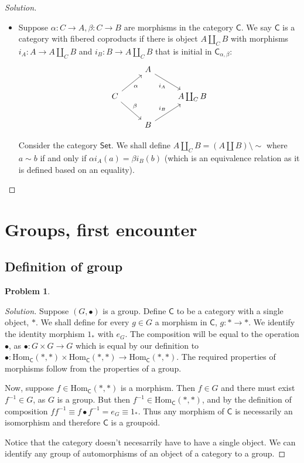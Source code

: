\documentclass{article}
\theoremstyle{definition}
\newtheorem{problem-internal}{Problem}[subsection]
\newenvironment{problem}{
	\medskip
	\begin{problem-internal}
	}{
\end{problem-internal}
}
\newenvironment{solution}{
	\begin{proof}[Solution]
		\vspace{-8px}
		\setlength{\parskip}{4px}
		\setlength{\parindent}{0px}
	}{
\end{proof}
}
\newcommand{\Hom}{\mathrm{Hom}}
\newcommand{\C}{\mathsf{C}}
\newcommand{\Cset}{\mathsf{Set}}
\begin{document}
\begin{solution}
\begin{itemize}
		\item Suppose $\alpha: C \to A, \beta: C \to B$ are morphisms in the category $\C$. We say $\C$ is a category with fibered coproducts if there is object $A \coprod_C B$ with morphisms $i_A : A \to A \coprod_C B$ and $i_B: B \to A \coprod_C B$ that is initial in $\C_{\alpha,\beta}$:
		\begin{equation*}
			\begin{tikzcd}
				& A \arrow[dr, "i_A" swap] &\\
				C
					\arrow[ur, "\alpha" swap]
					\arrow[dr, "\beta"]
					&
					& A \coprod_C B\\
				& B \arrow[ur, "i_B"] &
			\end{tikzcd}
		\end{equation*}
		
		Consider the category $\Cset$. We shall define $A \coprod_C B = (A \coprod B) \setminus \sim$ where $a \sim b$ if and only if $\alpha i_A(a) = \beta i_B(b)$ (which is an equivalence relation as it is defined based on an equality).
	\end{itemize}
\end{solution}

\section{Groups, first encounter}

\subsection{Definition of group}

\begin{problem}
\end{problem}

\begin{solution}
	Suppose $(G, \bullet)$ is a group. Define $\C$ to be a category with a single object, $*$. We shall define for every $g \in G$ a morphism in $\C$, $g: * \to *$. We identify the identity morphism $1_*$ with $e_G$. The composition will be equal to the operation $\bullet$, as $\bullet: G \times G \to G$ which is equal by our definition to $\bullet: \Hom_{\C}(*,*) \times \Hom_{\C}(*,*) \to \Hom_{\C}(*,*)$. The required properties of morphisms follow from the properties of a group.
	
	Now, suppose $f \in \Hom_{\C}(*,*)$ is a morphism. Then $f \in G$ and there must exist $f^{-1} \in G$, as $G$ is a group. But then $f^{-1} \in \Hom_{\C}(*,*)$, and by the definition of composition $ff^{-1} \equiv f \bullet f^{-1} = e_G \equiv 1_*$. Thus any morphism of $\C$ is necessarily an isomorphism and therefore $\C$ is a groupoid.
	
	Notice that the category doesn't necesarrily have to have a single object. We can identify any group of automorphisms of an object of a category to a group.
\end{solution}
\end{document}
